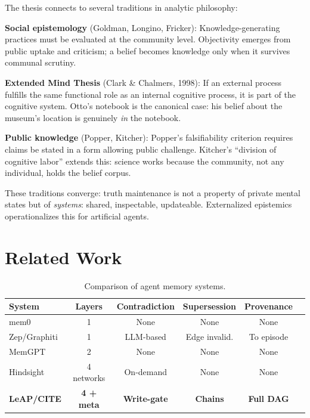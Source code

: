 \documentclass[11pt,letterpaper]{article}
\begin{document}
The thesis connects to several traditions in analytic philosophy:

\textbf{Social epistemology} (Goldman, Longino, Fricker): Knowledge-generating practices must be evaluated at the community level. Objectivity emerges from public uptake and criticism; a belief becomes knowledge only when it survives communal scrutiny.

\textbf{Extended Mind Thesis} (Clark \& Chalmers, 1998): If an external process fulfills the same functional role as an internal cognitive process, it is part of the cognitive system. Otto's notebook is the canonical case: his belief about the museum's location is genuinely \textit{in} the notebook.

\textbf{Public knowledge} (Popper, Kitcher): Popper's falsifiability criterion requires claims be stated in a form allowing public challenge. Kitcher's ``division of cognitive labor'' extends this: science works because the community, not any individual, holds the belief corpus.

These traditions converge: truth maintenance is not a property of private mental states but of \textit{systems}: shared, inspectable, updateable. Externalized epistemics operationalizes this for artificial agents.

\section{Related Work}

\begin{table}[H]
\centering
\caption{Comparison of agent memory systems.}
\label{tab:comparison}
\begin{tabular}{@{}lccccc@{}}
\toprule
\textbf{System} & \textbf{Layers} & \textbf{Contradiction} & \textbf{Supersession} & \textbf{Provenance} \\
\midrule
mem0 & 1 & None & None & None \\
Zep/Graphiti & 1 & LLM-based & Edge invalid. & To episode \\
MemGPT & 2 & None & None & None \\
Hindsight & 4 networks & On-demand & None & None \\
\textbf{LeAP/CITE} & \textbf{4 + meta} & \textbf{Write-gate} & \textbf{Chains} & \textbf{Full DAG} \\
\bottomrule
\end{tabular}
\end{table}
\end{document}
